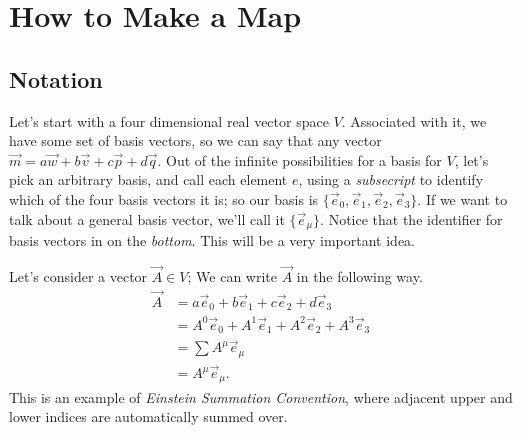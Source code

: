 \chapter{How to Make a Map}\label{chap:maps}
\section{Notation}
Let's start with a four dimensional real vector space $V$.
Associated with it, we have some set of basis vectors, so we can say that any vector $\vec{m} = a\vec{w} + b\vec{v} + c\vec{p} + d\vec{q}$.
Out of the infinite possibilities for a basis for $V$, let's pick an arbitrary basis, and call each element $e$, using a \emph{subsecript} to identify which of the four basis vectors it is; so our basis is $\{\vec{e}_0, \vec{e}_1, \vec{e}_2, \vec{e}_3\}$.
If we want to talk about a general basis vector, we'll call it $\{\vec{e}_\mu\}$. Notice that the identifier for basis vectors in on the \emph{bottom}. This will be a very important idea.

Let's consider a vector $\vec{A} \in V$; We can write $\vec{A}$ in the following way.
\begin{align*}
    \vec{A} &= a\vec{e}_0 + b\vec{e}_1 + c\vec{e}_2 + d\vec{e}_3 \\
            &= A^0\vec{e}_0 + A^1\vec{e}_1 + A^2\vec{e}_2 + A^3\vec{e}_3 \\
            &= \sum A^\mu \vec{e}_\mu \\
            &= A^\mu \vec{e}_\mu.
\end{align*}
This is an example of \emph{Einstein Summation Convention}, where adjacent upper and lower indices are automatically summed over.

